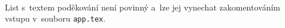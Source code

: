 
\pagestyle{empty}

{~}
\vfill

\noindent
List s~textem poděkování není povinný a~lze jej vynechat zakomentováním vstupu
v~souboru \texttt{app.tex}.

\newpage
